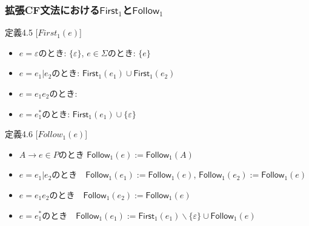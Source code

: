 \documentclass[dvipdfmx]{beamer}
\begin{document}
\begin{frame}
  \frametitle{拡張CF文法における$\mathsf{First}_1$と$\mathsf{Follow}_1$}
  \vspace*{-2mm}
  {\scriptsize
    \begin{itembox}[l]{定義4.5 [$First_1(e)$]}
      \begin{itemize}
        \item $e=\varepsilon$のとき: $\{\varepsilon\}$, $e\in\Sigma$のとき: $\{e\}$
        \item $e=e_1\vert e_2$のとき: $\mathsf{First}_1(e_1)\cup\mathsf{First}_1(e_2)$
        \item $e=e_1e_2$のとき:
        \item $e=e_1^\ast$のとき: $\mathsf{First}_1(e_1)\cup\{\varepsilon\}$
      \end{itemize}
    \end{itembox}
    \vspace*{-2mm}
    \begin{itembox}[l]{定義4.6 [$Follow_1(e)$]}
      \begin{itemize}
        \item $A\rightarrow e\in P$のとき $\mathsf{Follow}_1(e):=\mathsf{Follow}_1(A)$
        \item $e=e_1|e_2$のとき　$\mathsf{Follow}_1(e_1):=\mathsf{Follow}_1(e)$, $\mathsf{Follow}_1(e_2):=\mathsf{Follow}_1(e)$
        \item $e=e_1e_2$のとき　$\mathsf{Follow}_1(e_2):=\mathsf{Follow}_1(e)$\\
        \item $e=e_1^\ast$のとき　$\mathsf{Follow}_1(e_1):=\mathsf{First}_1(e_1)\backslash\{\varepsilon\}\cup\mathsf{Follow}_1(e)$
      \end{itemize}
    \end{itembox}
  }
\end{frame}
\end{document}
